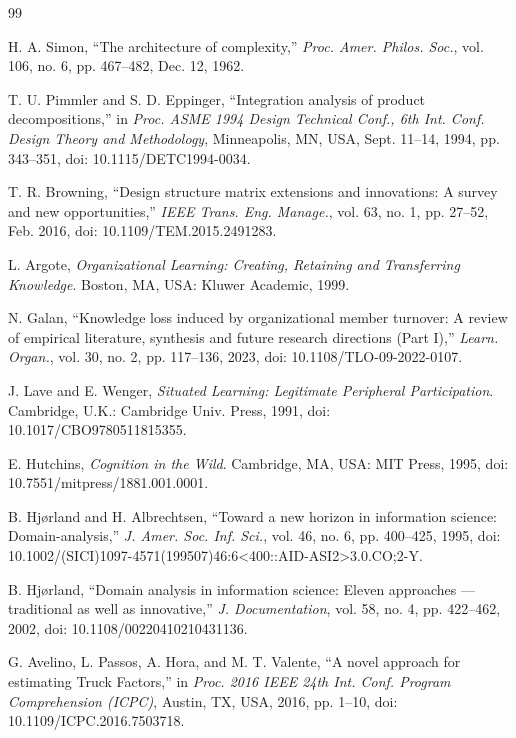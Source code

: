 \documentclass[conference]{IEEEtran}
\begin{document}
\begin{thebibliography}{99}

 H. A. Simon, ``The architecture of complexity,'' \emph{Proc. Amer. Philos. Soc.}, vol. 106, no. 6, pp. 467--482, Dec. 12, 1962.

 T. U. Pimmler and S. D. Eppinger, ``Integration analysis of product decompositions,'' in \emph{Proc. ASME 1994 Design Technical Conf., 6th Int. Conf. Design Theory and Methodology}, Minneapolis, MN, USA, Sept. 11--14, 1994, pp. 343--351, doi: 10.1115/DETC1994-0034.

 T. R. Browning, ``Design structure matrix extensions and innovations: A survey and new opportunities,'' \emph{IEEE Trans. Eng. Manage.}, vol. 63, no. 1, pp. 27--52, Feb. 2016, doi: 10.1109/TEM.2015.2491283.

 L. Argote, \emph{Organizational Learning: Creating, Retaining and Transferring Knowledge}. Boston, MA, USA: Kluwer Academic, 1999.

 N. Galan, ``Knowledge loss induced by organizational member turnover: A review of empirical literature, synthesis and future research directions (Part I),'' \emph{Learn. Organ.}, vol. 30, no. 2, pp. 117--136, 2023, doi: 10.1108/TLO-09-2022-0107.

 J. Lave and E. Wenger, \emph{Situated Learning: Legitimate Peripheral Participation}. Cambridge, U.K.: Cambridge Univ. Press, 1991, doi: 10.1017/CBO9780511815355.

 E. Hutchins, \emph{Cognition in the Wild}. Cambridge, MA, USA: MIT Press, 1995, doi: 10.7551/mitpress/1881.001.0001.

 B. Hj{\o}rland and H. Albrechtsen, ``Toward a new horizon in information science: Domain-analysis,'' \emph{J. Amer. Soc. Inf. Sci.}, vol. 46, no. 6, pp. 400--425, 1995, doi: 10.1002/(SICI)1097-4571(199507)46:6\textless{}400::AID-ASI2\textgreater{}3.0.CO;2-Y.

 B. Hj{\o}rland, ``Domain analysis in information science: Eleven approaches --- traditional as well as innovative,'' \emph{J. Documentation}, vol. 58, no. 4, pp. 422--462, 2002, doi: 10.1108/00220410210431136.

 G. Avelino, L. Passos, A. Hora, and M. T. Valente, ``A novel approach for estimating Truck Factors,'' in \emph{Proc. 2016 IEEE 24th Int. Conf. Program Comprehension (ICPC)}, Austin, TX, USA, 2016, pp. 1--10, doi: 10.1109/ICPC.2016.7503718.


\end{thebibliography}
\end{document}
